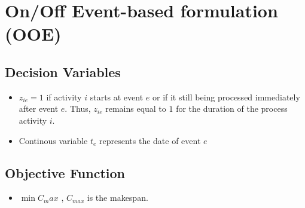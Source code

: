 \documentclass{paper}
\begin{document}
	\section{On/Off Event-based formulation (OOE)}
    \subsection{Decision Variables}
	\begin{itemize}
		\item $z_{ie} = 1$ if activity $i$ starts at event $e$ or if it still being processed immediately after event $e$.
		Thus, $z_{ie}$ remains equal to $1$ for the duration of the process activity $i$.
		\item Continous variable $t_e$ represents the date of event $e$
	\end{itemize}

	\subsection{Objective Function}
	\begin{itemize}
	\item $\min C_max$ , $C_{max}$ is the makespan.
	\end{itemize}
\end{document}
